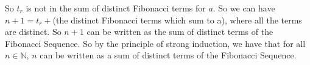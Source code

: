 \documentclass[12pt]{article}
\newcommand{\N}{\mathbb{N}}
\begin{document}
So $t_r$ is not in the sum of distinct Fibonacci terms for $a$. So we can have $n+1 = t_r +$(the distinct Fibonacci terms which sum to a), where all the terms are distinct. So $n+1$ can be written as the sum of distinct terms of the Fibonacci Sequence. So by the principle of strong induction, we have that for all $n\in\N$, $n$ can be written as a sum of distinct terms of the Fibonacci Sequence.
\end{document}

